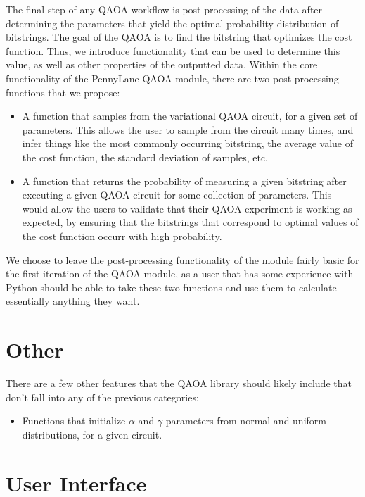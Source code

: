 \documentclass{article}
\begin{document}
The final step of any QAOA workflow is post-processing of the 
data after determining the parameters that yield the optimal 
probability distribution of bitstrings. The goal of the QAOA is 
to find the bitstring that optimizes the cost function. Thus, we 
introduce functionality that can be used to determine this value, as well as 
other properties of the outputted data.
\newline\newline
\noindent
Within the core functionality of the PennyLane QAOA module, 
there are two post-processing functions that we propose:

\begin{itemize}
	\item A function that samples from the variational QAOA circuit, for 
		a given set of parameters. This allows the user to sample from the 
		circuit many times, and infer things like the most commonly occurring 
		bitstring, the average value of the cost function, the standard deviation 
		of samples, etc.
	\item A function that returns the probability of measuring a given bitstring after executing 
		a given QAOA circuit for some collection of parameters. This would allow the users to validate 
		that their QAOA experiment is working
		as expected, by ensuring that the bitstrings that correspond to optimal values of the cost 
		function occurr with high probability.
\end{itemize}

We choose to leave the post-processing functionality of the module fairly basic for the 
first iteration of the QAOA module, 
as a user that has some experience with Python should be able to take these two functions 
and use them to calculate essentially anything they want.

\section{Other}

There are a few other features that the QAOA library should likely include that don't fall into 
any of the previous categories:

\begin{itemize}
	\item Functions that initialize $\alpha$ and $\gamma$ parameters from normal and uniform distributions, 
		for a given circuit.
\end{itemize}

\section{User Interface}
\end{document}
